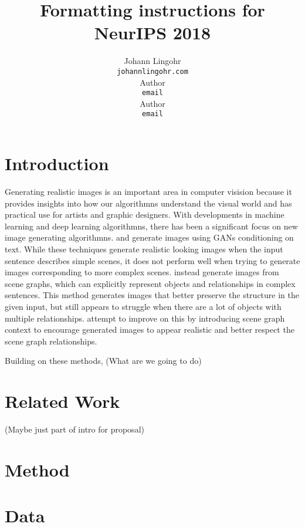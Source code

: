 \documentclass{article}
\title{Formatting instructions for NeurIPS 2018}
\author{%
  Johann Lingohr \\
  \texttt{johannlingohr\@gmail.com} \\
  \And
  Author \\
  \texttt{email} \\
  \And
  Author \\
  \texttt{email} \\
}
\begin{document}

\maketitle

\begin{abstract}

\end{abstract}

\section{Introduction}

Generating realistic images is an important area in computer visision because it provides insights into how our algorithmns understand the visual world and has practical use for artists and graphic designers. With developments in machine learning and deep learning algorithmns, there has been a significant focus on new image generating algorithmns. \citet{t2im} and \citet{stackedgan} generate images using GANs conditioning on text. While these techniques generate realistic looking images when the input sentence describes simple scenes, it does not perform well when trying to generate images corresponding to more complex scenes. \citet{sg2im} instead generate images from scene graphs, which can explicitly represent objects and relationships in complex sentences. This method generates images that better preserve the structure in the given input, but still appears to struggle when there are a lot of objects with multiple relationships. \citet{sg2imgcontext} attempt to improve on this by introducing scene graph context to encourage generated images to appear realistic and better respect the scene graph relationships.

Building on these methods, (What are we going to do)

\section{Related Work}

(Maybe just part of intro for proposal)

\section{Method}

\section{Data}

\medskip
\small

\end{document}
